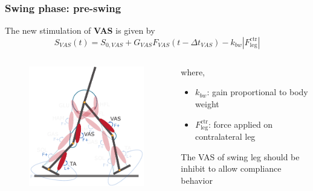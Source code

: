 \documentclass[10pt]{beamer}
\begin{document}
	\begin{frame}
		\frametitle{Swing phase: pre-swing}
		\begin{block}{}
			The new stimulation of \textbf{VAS} is given by
			\begin{equation*}
				S_{VAS}(t)=S_{0,VAS} + G_{VAS} F_{VAS} (t-\Delta t_{VAS}) - k_{bw}|F_{\textrm{leg}}^{\textrm{ctr}}|
			\end{equation*}
		\end{block}
		
		\begin{columns}
			\begin{column}{.5\textwidth}
				\begin{figure}
					\centering
					\includegraphics[width=.5\textheight]{images/new_model/swing/muscle_pre_vas.pdf}
				\end{figure}
			\end{column}
			\begin{column}{.5\textwidth}
				where,
				\begin{itemize}
					\item $k_{bw}$: gain proportional to body weight
					\item $F_{\textrm{leg}}^{\textrm{ctr}}$: force applied on contralateral leg
				\end{itemize}
				\begin{exampleblock}{}
					The VAS of swing leg should be inhibit to allow compliance behavior 
				\end{exampleblock}
			\end{column}
		\end{columns}	
	\end{frame}
	
\end{document}
